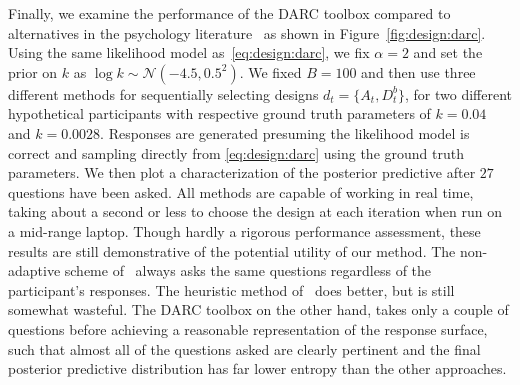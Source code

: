 Finally, we examine the performance of the DARC toolbox compared to alternatives in the
psychology literature~\citep{Kirby:2009eu,Frye:2016eu} as shown in Figure~\ref{fig:design:darc}.  Using the
same likelihood model as~\ref{eq:design:darc},
we fix $\alpha=2$ and set the prior on $k$ as $\log k \sim \mathcal{N}(-4.5,0.5^2)$.  We fixed $B=100$ and
then use three different methods for sequentially selecting designs $d_t = \{A_t,D^b_t\}$, for
two different hypothetical participants with respective ground truth parameters of $k=0.04$ and $k=0.0028$.
Responses are generated presuming the likelihood model is correct and sampling directly from
\eqref{eq:design:darc} using the ground truth parameters.  We then plot a characterization of the posterior
predictive after $27$ questions have been asked.  All methods are capable of working in real time, taking
about a second or less to choose the design at each iteration when run on a mid-range laptop.  Though 
hardly a rigorous performance assessment, these results are still demonstrative of the potential utility of our
method.  The non-adaptive scheme of~\cite{Kirby:2009eu} always asks the same questions regardless of
the participant's responses.  The heuristic method of~\cite{Frye:2016eu} does better, but is still somewhat
wasteful.  The DARC toolbox on the other hand, takes only a couple of questions before achieving a
reasonable representation of the response surface, such that almost all of the questions asked are clearly
pertinent and the final posterior predictive distribution has far lower entropy than the other approaches.
